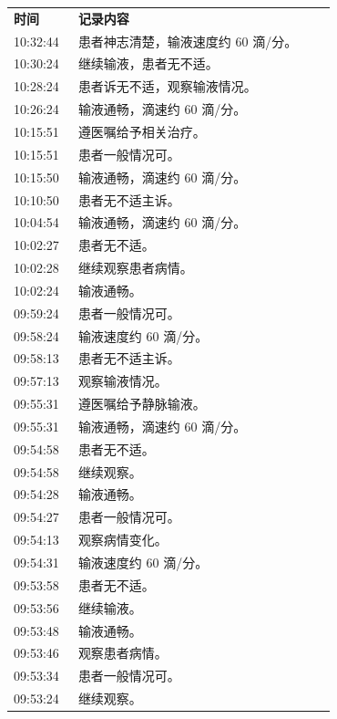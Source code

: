 \documentclass[UTF8,10pt,a4paper,fontset=fandol]{ctexart}
\begin{document}
\begin{tabular}{p{0.18\linewidth}p{0.72\linewidth}}
\textbf{时间} & \textbf{记录内容}\\
10:32:44 & 患者神志清楚，输液速度约 60 滴/分。\\
10:30:24 & 继续输液，患者无不适。\\
10:28:24 & 患者诉无不适，观察输液情况。\\
10:26:24 & 输液通畅，滴速约 60 滴/分。\\
10:15:51 & 遵医嘱给予相关治疗。\\
10:15:51 & 患者一般情况可。\\
10:15:50 & 输液通畅，滴速约 60 滴/分。\\
10:10:50 & 患者无不适主诉。\\
10:04:54 & 输液通畅，滴速约 60 滴/分。\\
10:02:27 & 患者无不适。\\
10:02:28 & 继续观察患者病情。\\
10:02:24 & 输液通畅。\\
09:59:24 & 患者一般情况可。\\
09:58:24 & 输液速度约 60 滴/分。\\
09:58:13 & 患者无不适主诉。\\
09:57:13 & 观察输液情况。\\
09:55:31 & 遵医嘱给予静脉输液。\\
09:55:31 & 输液通畅，滴速约 60 滴/分。\\
09:54:58 & 患者无不适。\\
09:54:58 & 继续观察。\\
09:54:28 & 输液通畅。\\
09:54:27 & 患者一般情况可。\\
09:54:13 & 观察病情变化。\\
09:54:31 & 输液速度约 60 滴/分。\\
09:53:58 & 患者无不适。\\
09:53:56 & 继续输液。\\
09:53:48 & 输液通畅。\\
09:53:46 & 观察患者病情。\\
09:53:34 & 患者一般情况可。\\
09:53:24 & 继续观察。\\
\end{tabular}

\vspace{1em}
\end{document}
